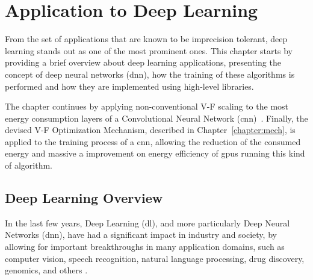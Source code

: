
\chapter{Application to Deep Learning}
\label{chapter:results}

From the set of applications that are known to be imprecision tolerant, deep learning stands out as one of the most prominent ones. This chapter starts by providing a brief  overview about deep learning applications, presenting the concept of deep neural networks (\acrshort{dnn}), how the training of these algorithms is performed and how they are implemented using high-level libraries.

The chapter continues by applying non-conventional V-F scaling to the most energy consumption layers of a Convolutional Neural Network (\acrshort{cnn})~\cite{li_evaluating_2016}. Finally, the devised V-F Optimization Mechanism, described in Chapter~\ref{chapter:mech}, is applied to the training process of a \acrshort{cnn}, allowing the reduction of the consumed energy and massive a improvement on energy efficiency of \acrshort{gpu}s running this kind of algorithm.


\section{Deep Learning Overview}
\label{section:problem}

In the last few years, Deep Learning (\acrshort{dl}), and more particularly Deep Neural Networks (\acrshort{dnn}), have had a significant impact in industry and society, by allowing for important breakthroughs in many application domains, such as computer vision, speech recognition, natural language processing, drug discovery, genomics, and others \cite{shrestha_review_2019}.


